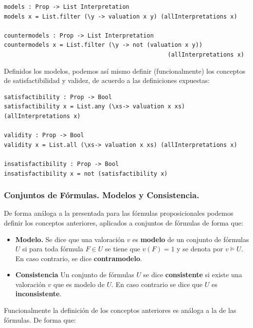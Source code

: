 \documentclass[a4paper]{report}
\begin{document}
\begin{lstlisting}[caption= {Función para el cálculo de los modelos de una fórmula proposicional}]
models : Prop -> List Interpretation
models x = List.filter (\y -> valuation x y) (allInterpretations x)

countermodels : Prop -> List Interpretation
countermodels x = List.filter (\y -> not (valuation x y)) 
                                               (allInterpretations x)
\end{lstlisting}

Definidos los modelos, podemos así mismo definir (funcionalmente) los conceptos de satisfactibilidad y validez, de acuerdo a las definiciones expuestas:\\


\begin{lstlisting}[caption={Funciones de Satisfactibilidad, Validez e Insatisfactibilidad}]
satisfactibility : Prop -> Bool
satisfactibility x = List.any (\xs-> valuation x xs) (allInterpretations x)

validity : Prop -> Bool
validity x = List.all (\xs-> valuation x xs) (allInterpretations x)

insatisfactibility : Prop -> Bool
insatisfactibility x = not (satisfactibility x)
\end{lstlisting}

\subsubsection{Conjuntos de Fórmulas. Modelos y Consistencia.}

De forma análoga a la presentada para las fórmulas proposicionales podemos definir los conceptos anteriores, aplicados a conjuntos de fórmulas de forma que:

\begin{itemize}
\item \textbf{Modelo.} Se dice que una valoración $v$ es \textbf{modelo} de un conjunto de fórmulas $U$ si para toda fórmula $F \in U$ se tiene que $v(F)=1$ y se denota por $v \models U$. En caso contrario, se dice \textbf{contramodelo}.

\item \textbf{Consistencia} Un conjunto de fórmulas $U$ se dice \textbf{consistente} si existe una valoración $v$ que es modelo de $U$. En caso contrario se dice que $U$ es \textbf{inconsistente}.
\end{itemize}

Funcionalmente la definición de los conceptos anteriores es análoga a la de las fórmulas. De forma que:\\
\end{document}
